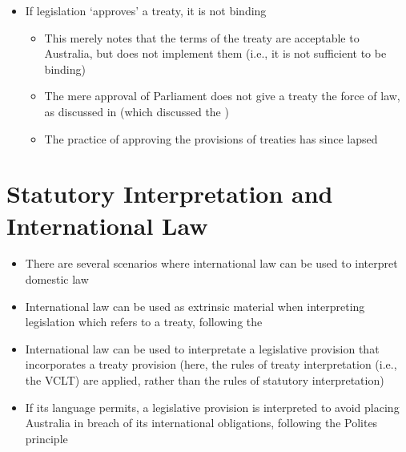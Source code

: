 \begin{itemize}
    \item If legislation `approves' a treaty, it is not binding
    \begin{itemize}
        \item This merely notes that the terms of the treaty are acceptable to Australia, but does not implement them (i.e., it is not sufficient to be binding)
        \item The mere approval of Parliament does not give a treaty the force of law, as discussed in  (which discussed the )
        \item The practice of approving the provisions of treaties has since lapsed
    \end{itemize}
\end{itemize}

\section{Statutory Interpretation and International Law}
\begin{itemize}
    \item There are several scenarios where international law can be used to interpret domestic law
    \item International law can be used as extrinsic material when interpreting legislation which refers to a treaty, following the 
    \item International law can be used to interpretate a legislative provision that incorporates a treaty provision (here, the rules of treaty interpretation (i.e., the VCLT) are applied, rather than the rules of statutory interpretation)
    \item If its language permits, a legislative provision is interpreted to avoid placing Australia in breach of its international obligations, following the Polites principle
\end{itemize}

